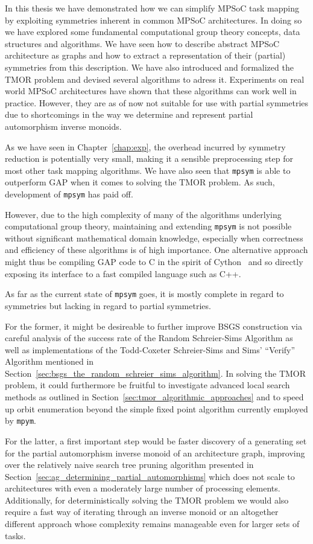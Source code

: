In this thesis we have demonstrated how we can simplify MPSoC task mapping by
exploiting symmetries inherent in common MPSoC architectures. In doing so we
have explored some fundamental computational group theory concepts, data
structures and algorithms. We have seen how to describe abstract MPSoC
architecture as graphs and how to extract a representation of their (partial)
symmetries from this description. We have also introduced and formalized the
TMOR problem and devised several algorithms to adress it. Experiments on real
world MPSoC architectures have shown that these algorithms can work well in
practice. However, they are as of now not suitable for use with partial
symmetries due to shortcomings in the way we determine and represent partial
automorphism inverse monoids.

As we have seen in Chapter~\ref{chap:exp}, the overhead incurred by symmetry
reduction is potentially very small, making it a sensible preprocessing step for
most other task mapping algorithms. We have also seen that \texttt{mpsym} is
able to outperform GAP when it comes to solving the TMOR problem. As such,
development of \texttt{mpsym} has paid off.

However, due to the high complexity of many of the algorithms underlying
computational group theory, maintaining and extending \texttt{mpsym} is not
possible without significant mathematical domain knowledge, especially when
correctness and efficiency of these algorithms is of high importance.
One alternative approach might thus be compiling GAP code to C in the spirit of
Cython~\cite{cython} and so directly exposing its interface to a fast compiled
language such as C++.

As far as the current state of \texttt{mpsym} goes, it is mostly complete in
regard to symmetries but lacking in regard to partial symmetries.

For the former, it might be desireable to further improve BSGS construction via
careful analysis of the success rate of the Random Schreier-Sims Algorithm as
well as implementations of the Todd-Coxeter Schreier-Sims and Sims' ``Verify''
Algorithm mentioned in
Section~\ref{sec:bsgs_the_random_schreier_sims_algorithm}. In solving the TMOR
problem, it could furthermore be fruitful to investigate advanced local search
methods as outlined in Section~\ref{sec:tmor_algorithmic_approaches} and to
speed up orbit enumeration beyond the simple fixed point algorithm currently
employed by \texttt{mpym}.

For the latter, a first important step would be faster discovery of a
generating set for the partial automorphism inverse monoid of an architecture
graph, improving over the relatively naive search tree pruning algorithm
presented in Section~\ref{sec:ag_determining_partial_automorphisms} which does
not scale to architectures with even a moderately large number of processing
elements.  Additionally, for deterministically solving the TMOR problem we
would also require a fast way of iterating through an inverse monoid or an
altogether different approach whose complexity remains manageable even for
larger sets of tasks.
